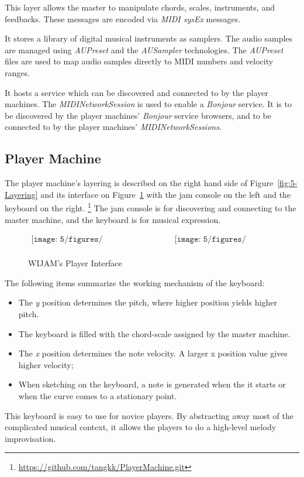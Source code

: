 This layer allows the master to manipulate chords, scales, instruments, and feedbacks. These messages are encoded via \textit{MIDI sysEx} messages.

It stores a library of digital musical instruments as samplers. The audio samples are managed using \textit{AUPreset} and the \textit{AUSampler} technologies. The \textit{AUPreset} files are used to map audio samples directly to MIDI numbers and velocity ranges.

It hosts a service which can be discovered and connected to by the player machines. The \textit{MIDINetworkSession} is used to enable a \textit{Bonjour} service. It is to be discovered by the player machines' \textit{Bonjour} service browsers, and to be connected to by the player machines' \textit{MIDINetworkSessions}.

\subsection{Player Machine}
The player machine's layering is described on the right hand side of Figure~\ref{fig:5-Layering} and its interface on Figure~\ref{fig:5-PlayerMachineVC} with the jam console on the left and the keyboard on the right. \footnote{\url{https://github.com/tangkk/PlayerMachine.git}} The jam console is for discovering and connecting to the master machine, and the keyboard is for musical expression.
\begin{figure}[htbp]
\begin{center}$
\begin{array}{cc}
\texttt{[image: 5/figures/PlayerMachineVC.png]} &
\texttt{[image: 5/figures/Simple.png]} \\
\end{array}$
\end{center}
\caption{WIJAM's Player Interface}
\label{fig:5-PlayerMachineVC}
\end{figure}

\noindent
The following items summarize the working mechanism of the keyboard:
\begin{itemize}
\item
The \textit{y} position determines the pitch, where higher position yields higher pitch.
\item
The keyboard is filled with the chord-scale assigned by the master machine.
\item
The \textit{x} position determines the note velocity. A larger x position value gives higher velocity;
\item
When sketching on the keyboard, a note is generated when the it starts or when the curve comes to a stationary point.
\end{itemize}
This keyboard is easy to use for novice players. By abstracting away most of the complicated musical context, it allows the players to do a high-level melody improvisation.

